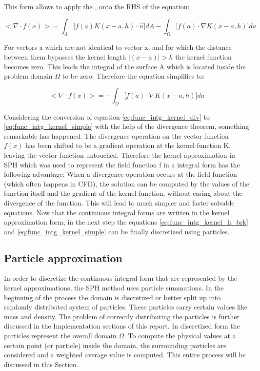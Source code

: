 This form allows to apply the  , onto the RHS of the equation:

\begin{equation} \label{eq:func_intg_kernel_h_brk_div_theo}
< \nabla \cdot f(x) > = 
\int_{A} \biggl [ f(a) K(x-a, h) \cdot \vec{n}  \biggr ] d A -
\int_{\Omega} \biggl [ f(a) \cdot \nabla K(x-a, h) \biggr ] d a
\end{equation}

For vectors a which are not identical to vector x, and for which the distance between them bypasses the kernel length  $|(x-a)| > h $  the kernel function becomes zero. This leads the integral of the surface A which is located inside the problem domain $\Omega$ to be zero. Therefore the equation simplifies to:

\begin{equation} \label{eq:func_intg_kernel_simple}
< \nabla \cdot f(x) > = 
- \int_{\Omega} \biggl [ f(a) \cdot \nabla K(x-a, h) \biggr ] d a
\end{equation}

Considering the conversion of equation \ref{eq:func_intg_kernel_div} to \ref{eq:func_intg_kernel_simple} with the help of the divergence theorem, something remarkable has happened. The divergence operation on the vector function $f(x)$ has been shifted to be a gradient operation at the kernel function K, leaving the vector function untouched. Therefore the kernel approximation in SPH which was used to represent the field function f in a integral form has the following advantage: When a divergence operation occurs at the field function (which often happens in CFD), the solution can be computed by the values of the function itself and the gradient of the kernel function, without caring about the divergence of the function. This will lead to much simpler and faster solvable equations. Now that the continuous integral forms are written in the kernel approximation form, in the next step the equations \ref{eq:func_intg_kernel_h_brk} and \ref{eq:func_intg_kernel_simple} can be finally discretized using particles.

\subsection{Particle approximation}

In order to discretize the continuous integral form that are represented by the kernel approximations, the SPH method uses particle summations. In the beginning of the process the domain is discretized or better split up into randomly distributed system of particles. These particles carry certain values like mass and density. The problem of correctly distributing the particles is further discussed in the Implementation sections of this report. 
In discretized form the particles represent the overall domain $\Omega$. To compute the physical values at a certain point (or particle) inside the domain, the surrounding particles are considered and a weighted average value is computed. This entire process will be discussed in this Section.

